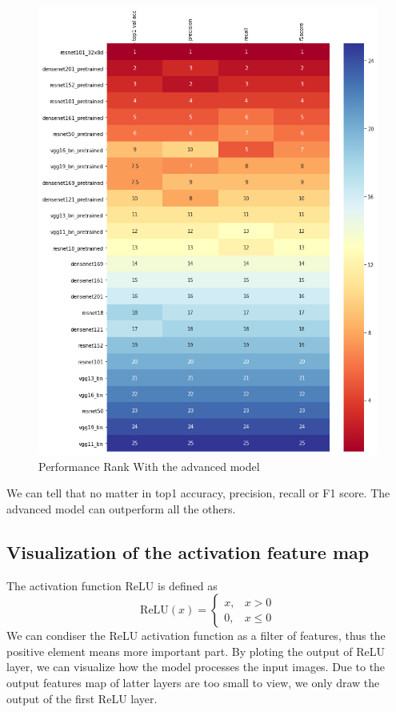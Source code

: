 \begin{figure}[H]
  \centering
  \includegraphics[width=\linewidth]{figs/rank2.png}
  \caption{Performance Rank With the advanced model}
  \label{fig:rank}
\end{figure}

We can tell that no matter in top1 accuracy, precision, recall or F1 score. The advanced model can outperform all the others.

\subsection{Visualization of the activation feature map}
The activation function ReLU is defined as
\begin{equation}
  \text{ReLU}(x)=\left\{
  \begin{array}{lr}
    x, & x > 0    \\
    0, & x \leq 0
  \end{array}
  \right.
\end{equation}
We can condiser the ReLU activation function as a filter of features, thus the positive element means more important part.
By ploting the output of ReLU layer, we can visualize how the model processes the input images.
Due to the output features map of latter layers are too small to view, we only draw the output of the first ReLU layer.


